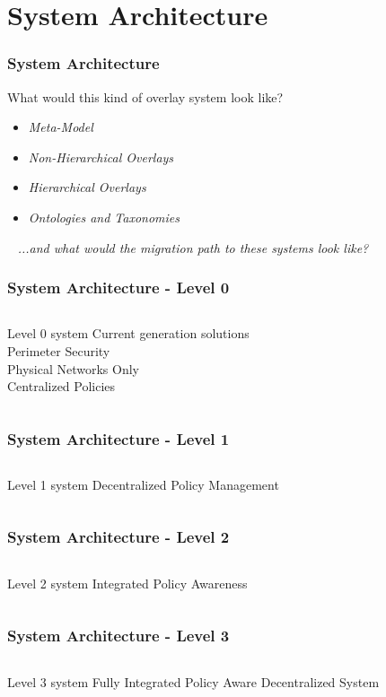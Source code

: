 \section{System Architecture}
\begin{frame}
\frametitle{System Architecture}
What would this kind of overlay system look like?
\begin{itemize}
\item<2-> \textit{Meta-Model}
\item<3-> \textit{Non-Hierarchical Overlays}
\item<4-> \textit{Hierarchical Overlays}
\item<5-> \textit{Ontologies and Taxonomies}
\end{itemize}
\
\newline
\newline
\pause
\textit{...and what would the migration path to these systems look like?}
\end{frame}

\begin{frame}[t]
\frametitle{System Architecture - Level 0}
\begin{columns}[t]
Level 0 system 
Current generation solutions \\
Perimeter Security \\
Physical Networks Only \\
Centralized Policies
\end{columns}
\end{frame}

\begin{frame}[t]
\frametitle{System Architecture - Level 1}
\begin{columns}[t]
Level 1 system 
Decentralized Policy Management
\end{columns}
\end{frame}

\begin{frame}[t]
\frametitle{System Architecture - Level 2}
\begin{columns}[t]
Level 2 system 
Integrated Policy Awareness
\end{columns}
\end{frame}

\begin{frame}[t]
\frametitle{System Architecture - Level 3}
\begin{columns}[t]
Level 3 system 
Fully Integrated Policy Aware Decentralized System
\end{columns}
\end{frame}